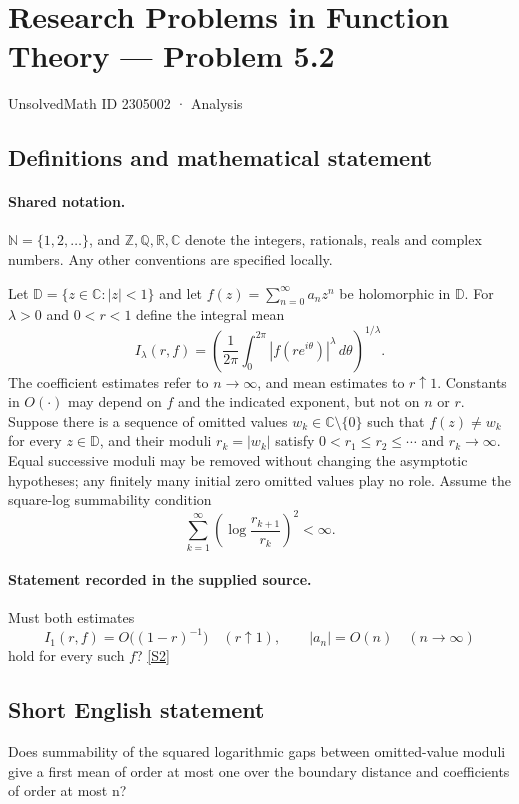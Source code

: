 \documentclass[11pt]{book}
\newcommand{\sref}[2]{\hyperlink{source:#1:#2}{[S#2]}}
\begin{document}
\setcounter{section}{2305001}
\section{Research Problems in Function Theory — Problem 5.2}\label{2305002}
{\small\sffamily UnsolvedMath ID 2305002 · Analysis}
\subsection{Definitions and mathematical statement}

\paragraph{Shared notation.}$\mathbb N=\{1,2,\ldots\}$, and $\mathbb Z,\mathbb Q,\mathbb R,\mathbb C$ denote the integers, rationals, reals and complex numbers. Any other conventions are specified locally.


Let $\mathbb D=\{z\in\mathbb C:|z|<1\}$ and let $f(z)=\sum_{n=0}^\infty a_nz^n$ be holomorphic in $\mathbb D$. For $\lambda>0$ and $0<r<1$ define the integral mean
\[I_\lambda(r,f)=\left(\frac1{2\pi}\int_0^{2\pi}|f(re^{i\theta})|^\lambda\,d\theta\right)^{1/\lambda}.
\]
The coefficient estimates refer to $n\to\infty$, and mean estimates to $r\uparrow1$. Constants in $O(\cdot)$ may depend on $f$ and the indicated exponent, but not on $n$ or $r$.
Suppose there is a sequence of omitted values $w_k\in\mathbb C\setminus\{0\}$ such that $f(z)\ne w_k$ for every $z\in\mathbb D$, and their moduli $r_k=|w_k|$ satisfy $0<r_1\le r_2\le\cdots$ and $r_k\to\infty$. Equal successive moduli may be removed without changing the asymptotic hypotheses; any finitely many initial zero omitted values play no role. Assume the square-log summability condition
\[\sum_{k=1}^\infty\left(\log\frac{r_{k+1}}{r_k}\right)^2<\infty.
\]
\paragraph{Statement recorded in the supplied source.}
Must both estimates
\[I_1(r,f)=O\bigl((1-r)^{-1}\bigr)\quad(r\uparrow1),\qquad |a_n|=O(n)\quad(n\to\infty)
\]
hold for every such $f$? \sref{2305002}{2}
\subsection{Short English statement}
Does summability of the squared logarithmic gaps between omitted-value moduli give a first mean of order at most one over the boundary distance and coefficients of order at most n?
\end{document}
